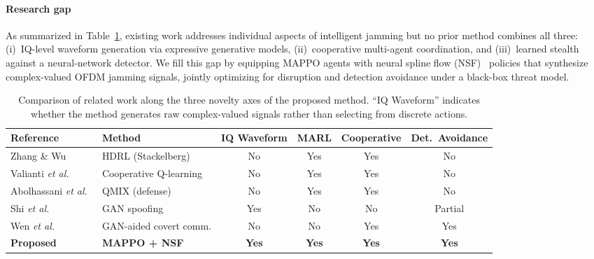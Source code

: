 \paragraph{Research gap}
As summarized in Table~\ref{tab:related_works}, existing work addresses
individual aspects of intelligent jamming but no prior method combines all three:
(i)~IQ-level waveform generation via expressive generative models,
(ii)~cooperative multi-agent coordination, and
(iii)~learned stealth against a neural-network detector.
We fill this gap by equipping MAPPO agents with neural spline flow
(NSF)~\cite{durkan2019nsf} policies that synthesize complex-valued OFDM jamming
signals, jointly optimizing for disruption and detection avoidance under a
black-box threat model.

\begin{table}[!t]
\renewcommand{\arraystretch}{1.3}
\caption{Comparison of related work along the three novelty axes of the proposed
method. ``IQ Waveform'' indicates whether the method generates raw complex-valued
signals rather than selecting from discrete actions.}
\label{tab:related_works}
\centering
\begin{tabular}{l l c c c c}
\hline\hline
\textbf{Reference} & \textbf{Method} & \textbf{IQ Waveform} & \textbf{MARL}
  & \textbf{Cooperative} & \textbf{Det.\ Avoidance} \\
\hline
Zhang \& Wu~\cite{article}
  & HDRL (Stackelberg)     & No  & Yes & Yes & No  \\
Valianti \emph{et al.}~\cite{valianti2024cooperative}
  & Cooperative Q-learning & No  & Yes & Yes & No  \\
Abolhassani \emph{et al.}~\cite{abolhassani2025coordinated}
  & QMIX (defense)         & No  & Yes & Yes & No  \\
Shi \emph{et al.}~\cite{sagduyu2021gan}
  & GAN spoofing           & Yes & No  & No  & Partial \\
Wen \emph{et al.}~\cite{wen2025generative}
  & GAN-aided covert comm. & No  & No  & Yes & Yes \\
\textbf{Proposed}
  & \textbf{MAPPO + NSF}   & \textbf{Yes} & \textbf{Yes}
  & \textbf{Yes} & \textbf{Yes} \\
\hline\hline
\end{tabular}
\end{table}
